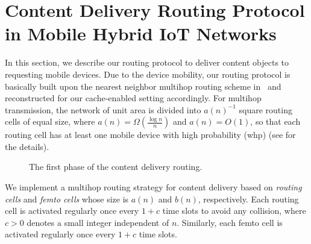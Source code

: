 \documentclass[10pt,journal,compsoc,onecolumn]{IEEEtran}
\begin{document}
\section{Content Delivery Routing Protocol in Mobile Hybrid IoT Networks} \label{routing}
In this section, we describe our routing protocol to deliver
content objects to requesting mobile devices. Due to the device mobility, our
routing protocol is basically built upon the nearest neighbor
multihop routing scheme in~\cite{c1} and reconstructed for our
cache-enabled setting accordingly. For multihop transmission, the
network of unit area is divided into $a(n)^{-1}$ square routing
cells of equal size, where $a(n)=\Omega\left(\frac{\log
n}{n}\right)$ and $a(n)=O(1)$, so that each routing cell has at
least one mobile device with high probability (whp) (see \cite{c8} for the details). %
\begin{figure*}[t!]
    \centering
    \caption{\small{The first phase of the content delivery routing.}}
    \label{1}
\end{figure*}
We implement a multihop routing strategy for content delivery
based on {\em routing cells} and {\em femto cells} whose size is $a(n)$ and
$b(n)$, respectively. Each routing cell is activated regularly
once every $1+c$ time slots to avoid any collision, where $c>0$
denotes a small integer independent of $n$. Similarly, each femto
cell is activated regularly once every $1+c$ time slots. 
\end{document}
